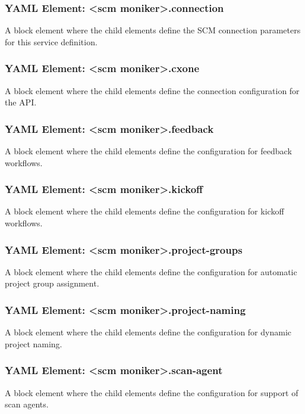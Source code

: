 \subsubsection{YAML Element: <scm moniker>.connection}\label{sec:yaml-moniker-connection}
A block element where the child elements define the SCM connection parameters for this service definition.

\subsubsection{YAML Element: <scm moniker>.cxone}\label{sec:yaml-moniker-cxone}
A block element where the child elements define the connection configuration for the \cxone API. 

\subsubsection{YAML Element: <scm moniker>.feedback}\label{sec:yaml-moniker-feedback}
A block element where the child elements define the configuration for feedback workflows. 

\subsubsection{YAML Element: <scm moniker>.kickoff}\label{sec:yaml-moniker-kickoff}
A block element where the child elements define the configuration for kickoff workflows. 

\subsubsection{YAML Element: <scm moniker>.project-groups}\label{sec:yaml-moniker-project-groups}
A block element where the child elements define the configuration for automatic project group assignment. 

\subsubsection{YAML Element: <scm moniker>.project-naming}\label{sec:yaml-moniker-project-naming}
A block element where the child elements define the configuration for dynamic project naming. 

\subsubsection{YAML Element: <scm moniker>.scan-agent}\label{sec:yaml-moniker-scan-agent}
A block element where the child elements define the configuration for support of scan agents. 

